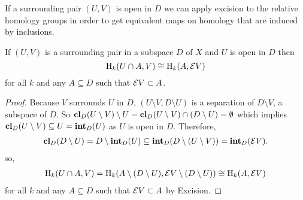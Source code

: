 If a surrounding pair $(U, V)$ is open in $D$ we can apply excision to the relative homology groups in order to get equivalent maps on homology that are induced by inclusions.

\begin{lemma}\label{lem:excision}
  If $(U, V)$ is a surrounding pair in a subspace $D$ of $X$ and $U$ is open in $D$ then
  \[ \mathrm{H}_k(U\cap A, V) \cong \mathrm{H}_k(A, \mathcal{E} V) \]
  for all $k$ and any $A\subseteq D$ such that $\mathcal{E} V\subset A$.
\end{lemma}
\begin{proof}
  Because $V$ surrounds $U$ in $D$, $(U\setminus V, D\setminus U)$ is a separation of $D\setminus V$, a subspace of $D$.
  So $\mathbf{cl}_D(U\setminus V)\setminus U = \mathbf{cl}_D(U\setminus V) \cap (D\setminus U) = \emptyset$ which implies $\mathbf{cl}_D(U\setminus V)\subseteq U = \mathbf{int}_D(U)$ as $U$ is open in $D$.
  Therefore,
  \begin{align*}
    \mathbf{cl}_D(D\setminus U) = D\setminus \mathbf{int}_D(U)\subseteq\mathbf{int}_D(D\setminus (U\setminus V)) = \mathbf{int}_D(\mathcal{E} V).
  \end{align*}
  so,
  \begin{align*}
    \mathrm{H}_k(U\cap A, V) = \mathrm{H}_k(A\setminus (D\setminus U), \mathcal{E} V\setminus (D\setminus U)) \cong \mathrm{H}_k(A, \mathcal{E} V)
  \end{align*}
  for all $k$ and any $A\subseteq D$ such that $\mathcal{E} V\subset A$ by Excision.
\end{proof}
